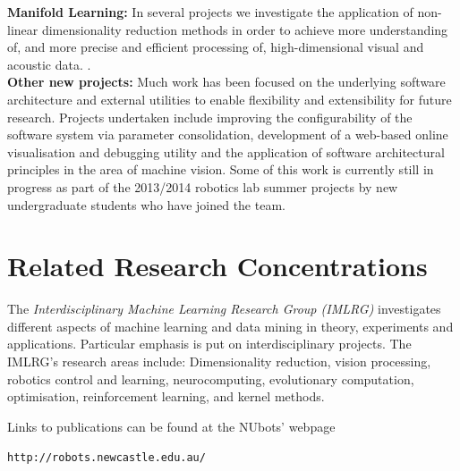 \documentclass{llncs}
\begin{document}
\noindent\textbf{Manifold Learning:} In several projects we
investigate the application of non-linear dimensionality reduction
methods in order to achieve more understanding of, and more precise 
and efficient processing of, high-dimensional visual and acoustic data.
\cite{ChalupEtAl2007b,WongChalup_WCCI_2008,WongChalup2008,WongEtAl2012}.
\\

\noindent\textbf{Other new projects:} Much work has been focused on the underlying software architecture and external utilities to enable flexibility and extensibility for future research. Projects undertaken include improving the configurability of the software system via parameter consolidation, development of a web-based online visualisation and debugging utility and the application of software architectural principles in the area of machine vision. Some of this work is currently still in progress as part of the 2013/2014 robotics lab summer projects by new undergraduate students who have joined the team.

\section{Related Research Concentrations}

The \emph{Interdisciplinary Machine Learning Research Group (IMLRG)} investigates different aspects of machine learning and data mining in theory, experiments and applications. Particular emphasis is put on interdisciplinary projects. The IMLRG's research areas include: Dimensionality reduction, vision processing, robotics control and learning, neurocomputing, evolutionary computation, optimisation, reinforcement learning, and kernel methods.

\noindent Links to publications can be found at the NUbots' webpage
\begin{center}
\texttt{http://robots.newcastle.edu.au/}
\end{center}



\end{document}

